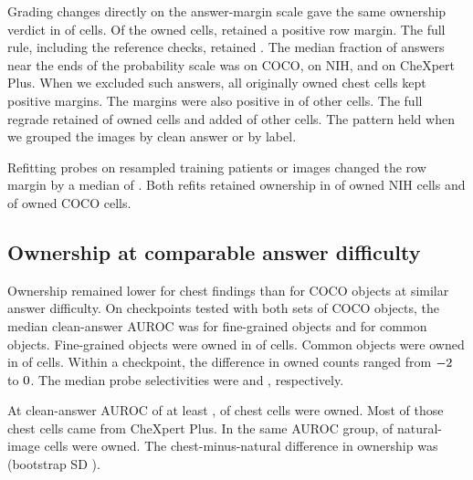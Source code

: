 

Grading changes directly on the answer-margin scale gave the same ownership verdict in \cfScaleAgree{} of \cfScaleAgreeN{} cells. Of the \cfScaleOwned{} owned cells, \cfScaleOwnedMpos{} retained a positive row margin. The full rule, including the reference checks, retained \cfScaleOwnedKeepFull{}. The median fraction of answers near the ends of the probability scale was \cfScaleSatCoco{} on COCO, \cfScaleSatNih{} on NIH, and \cfScaleSatChex{} on CheXpert Plus. When we excluded such answers, all \cfScaleUnsatOwned{} originally owned chest cells kept positive margins. The margins were also positive in \cfScaleUnsatOtherPos{} of \cfScaleUnsatOther{} other cells. The full regrade retained \cfScaleUnsatGradeKept{} of \cfScaleUnsatGradeN{} owned cells and added \cfScaleUnsatGradeGained{} of \cfScaleUnsatGradeOtherN{} other cells. The pattern held when we grouped the images by clean answer or by label.

Refitting probes on resampled training patients or images changed the row margin by a median of \cfScaleRefitMedian{}. Both refits retained ownership in \cfRefitGradeStableNih{} of \cfRefitGradeOwnedNih{} owned NIH cells and \cfRefitGradeStableCoco{} of \cfRefitGradeOwnedCoco{} owned COCO cells.


\subsection{Ownership at comparable answer difficulty}
\label{sec:coco}

Ownership remained lower for chest findings than for COCO objects at similar answer difficulty. On checkpoints tested with both sets of COCO objects, the median clean-answer AUROC was \cfFgFineAuroc{} for fine-grained objects and \cfFgEasySameAuroc{} for common objects. Fine-grained objects were owned in \cfFgFineOwned{} of \cfFgFineCells{} cells. Common objects were owned in \cfFgEasySameOwned{} of \cfFgEasySameCells{} cells. Within a checkpoint, the difference in owned counts ranged from $-2$ to $0$. The median probe selectivities were \cfFgFineSel{} and \cfFgEasySameSel{}, respectively.

At clean-answer AUROC of at least \cfStratTopEdge{}, \cfStratChestTopOwned{} of \cfStratChestTopN{} chest cells were owned. Most of those chest cells came from CheXpert Plus. In the same AUROC group, \cfStratNatTopOwned{} of \cfStratNatTopN{} natural-image cells were owned. The chest-minus-natural difference in ownership was \jnTopDiff{} (bootstrap SD \jnTopDiffSd{}).


